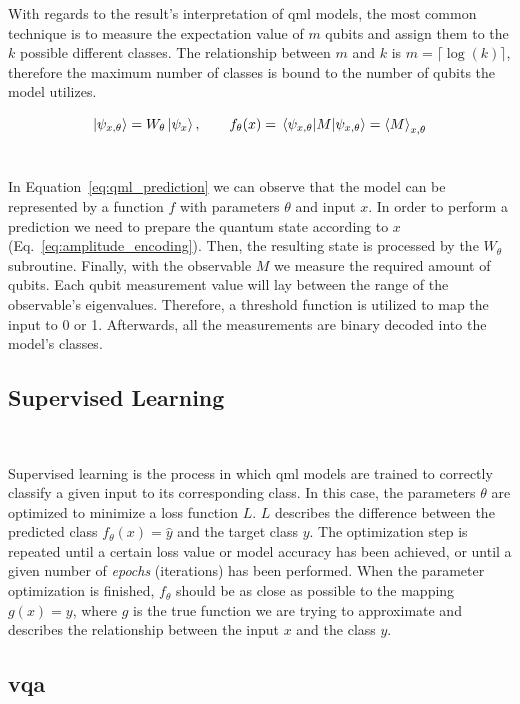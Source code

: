 With regards to the result's interpretation of \ac{qml} models, the most
common technique is to measure the expectation value of \(m\) qubits and
assign them to the \(k\) possible different classes. The relationship
between \(m\) and \(k\) is \(m = \lceil \log(k) \rceil\), therefore the
maximum number of classes is bound to the number of qubits the model
utilizes. \

\begin{equation}\label{eq:qml_prediction}
  \ket{\psi_{x,\theta}} = W_{\theta} \ket{\psi_{x}}, \qquad
  f_{\theta}(x) = \expval{M}{\psi_{x,\theta}} = \expval{M}_{x,\theta}
\end{equation} \

In Equation~\ref{eq:qml_prediction} we can observe that the
model can be represented by a function \(f\) with parameters \(\theta\)
and input \(x\). In order to perform a prediction we need to prepare
the quantum state according to \(x\) (Eq.~\ref{eq:amplitude_encoding}).
Then, the resulting state is processed by the \(W_{\theta}\) subroutine.
Finally, with the observable \(M\) we measure the required amount of
qubits. Each qubit measurement value will lay between the range of the
observable's eigenvalues. Therefore, a threshold function is utilized to
map the input to 0 or 1. Afterwards, all the measurements are binary
decoded into the model's classes. \

\subsection{Supervised Learning}\label{subsection:supervised} \

Supervised learning is the process in which \ac{qml} models
are trained to correctly classify a given input to its
corresponding class. In this case, the parameters \(\theta\)
are optimized to minimize a loss function \(L\). \(L\) describes
the difference between the predicted class \(f_{\theta}(x) = \hat{y}\)
and the target class \(y\). The optimization step is repeated
until a certain loss value or model accuracy has been achieved,
or until a given number of \textit{epochs} (iterations) has been
performed. When the parameter optimization is finished,
\(f_{\theta}\) should be as close as possible to the
mapping \(g(x) = y\), where \(g\) is the true function
we are trying to approximate and describes the relationship
between the input \(x\) and the class \(y\). \

\subsection{\acl{vqa}}\label{subsection:vqa} \

